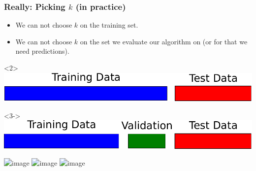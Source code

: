 \begin{frame}[t]
    \frametitle{Really: Picking $k$ (in practice)}
    \begin{itemize}
        \item We can not choose $k$ on the training set.
        \item We can not choose $k$ on the set we evaluate our algorithm on (or
            for that we need predictions).
    \end{itemize}
    \center
        \begin{onlyenv}<2>
            \includegraphics[width=.7\linewidth]{knn-pics/train_test_bars-crop}\\
        \end{onlyenv}
        \begin{onlyenv}<3->
            \includegraphics[width=.7\linewidth]{knn-pics/train_val_test_bars-crop}\\
        \end{onlyenv}

    \includegraphics<4>[width=.7\linewidth]{knn-pics/two_moons_cross_validation_1}
    \includegraphics<5>[width=.7\linewidth]{knn-pics/two_moons_cross_validation_2}
    \includegraphics<6>[width=.7\linewidth]{knn-pics/two_moons_cross_validation_3}

\end{frame}


